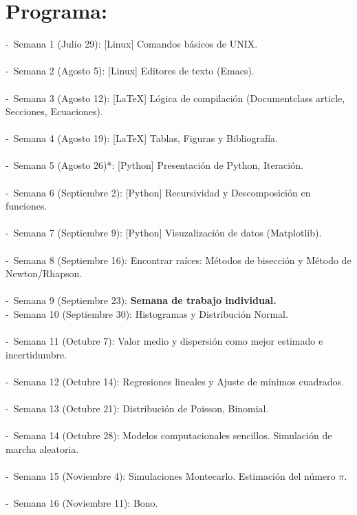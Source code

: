 \documentclass[letterpaper]{article}
\begin{document}
\section*{Programa:}
-\ Semana 1 (Julio 29): [Linux] Comandos b\'asicos de UNIX. \\
\\
-\ Semana 2 (Agosto 5): [Linux] Editores de texto (Emacs). \\
\\
-\ Semana 3 (Agosto 12): [\LaTeX] L\'ogica de compilaci\'on (Documentclass article, Secciones, Ecuaciones).\\
\\
-\ Semana 4 (Agosto 19): [\LaTeX] Tablas, Figuras y Bibliograf\'ia. \\
\\
-\ Semana 5 (Agosto 26)*: [Python] Presentaci\'on de Python, Iteraci\'on. \\
\\
-\ Semana 6 (Septiembre 2): [Python] Recursividad y Descomposici\'on en funciones. \\
\\
-\ Semana 7 (Septiembre 9): [Python] Visuzalizaci\'on de datos (Matplotlib). \\
\\
-\ Semana 8 (Septiembre 16): Encontrar ra\'ices: M\'etodos de bisecci\'on y  M\'etodo de \indent Newton/Rhapson. \\
\\
-\ Semana 9 (Septiembre 23): \textbf{Semana de trabajo individual.}
\\
-\ Semana 10 (Septiembre 30): Histogramas y Distribuci\'on Normal. \\
\\
-\ Semana 11 (Octubre 7): Valor medio y dispersi\'on como mejor estimado e incertidumbre. \\
\\
-\ Semana 12 (Octubre 14): Regresiones lineales y Ajuste de m\'inimos cuadrados. \\
\\
-\ Semana 13 (Octubre 21): Distribuci\'on de Poisson, Binomial. \\
\\
-\ Semana 14 (Octubre 28): Modelos computacionales sencillos. Simulaci\'on de marcha aleatoria. \\
\\
-\ Semana 15 (Noviembre 4): Simulaciones Montecarlo.  Estimaci\'on del n\'umero $\pi$. \\
\\
-\ Semana 16 (Noviembre 11): Bono.\\
\end{document}
